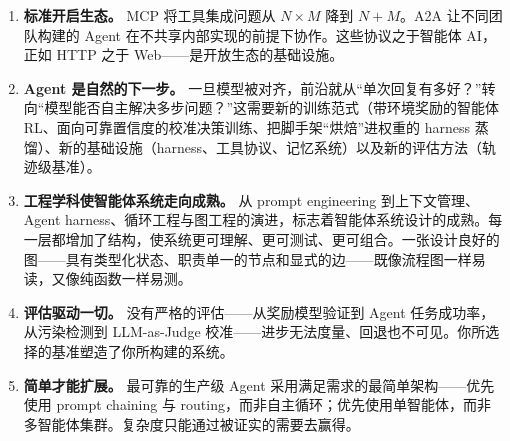 \begin{enumerate}
  \item \textbf{标准开启生态。} MCP 将工具集成问题从 $N \times M$ 降到 $N + M$。A2A 让不同团队构建的 Agent 在不共享内部实现的前提下协作。这些协议之于智能体 AI，正如 HTTP 之于 Web——是开放生态的基础设施。
  \item \textbf{Agent 是自然的下一步。} 一旦模型被对齐，前沿就从“单次回复有多好？”转向“模型能否自主解决多步问题？”这需要新的训练范式（带环境奖励的智能体 RL、面向可靠置信度的校准决策训练、把脚手架“烘焙”进权重的 harness 蒸馏）、新的基础设施（harness、工具协议、记忆系统）以及新的评估方法（轨迹级基准）。
  \item \textbf{工程学科使智能体系统走向成熟。} 从 prompt engineering 到上下文管理、Agent harness、循环工程与图工程的演进，标志着智能体系统设计的成熟。每一层都增加了结构，使系统更可理解、更可测试、更可组合。一张设计良好的图——具有类型化状态、职责单一的节点和显式的边——既像流程图一样易读，又像纯函数一样易测。
  \item \textbf{评估驱动一切。} 没有严格的评估——从奖励模型验证到 Agent 任务成功率，从污染检测到 LLM-as-Judge 校准——进步无法度量、回退也不可见。你所选择的基准塑造了你所构建的系统。
  \item \textbf{简单才能扩展。} 最可靠的生产级 Agent 采用满足需求的最简单架构——优先使用 prompt chaining 与 routing，而非自主循环；优先使用单智能体，而非多智能体集群。复杂度只能通过被证实的需要去赢得。
\end{enumerate}

